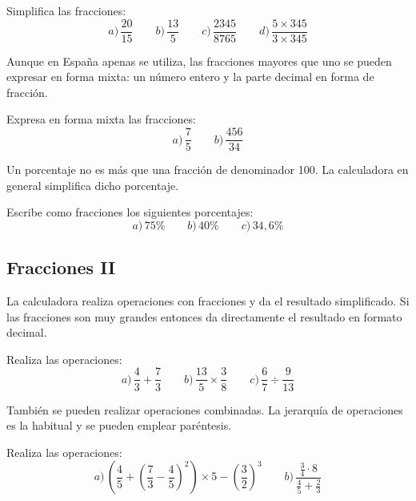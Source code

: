 \documentclass[12pt]{article}
\newenvironment{capitulo}{\begin{tcolorbox}[colback=blue!5!white,colframe=red!75!black]}{\end{tcolorbox}\bigskip}
\newenvironment{ejer}{\begin{tcolorbox}[center title, 
fonttitle=\sffamily\bfseries,colback=blue!5,colframe=orange]}{\end{tcolorbox}}
\begin{document}
\begin{ejer}

Simplifica las fracciones:
\[
a)\, \frac{20}{15} \qquad b)\, \frac{13}{5} \qquad c)\, \frac{2345}{8765} \qquad d)\, \frac{5\times 345}{3\times 345} 
\]

\end{ejer}

Aunque en España apenas se utiliza, las fracciones mayores que uno se pueden expresar en forma mixta: un número entero y la parte decimal en forma de fracción.

\begin{ejer} 

Expresa en forma mixta las fracciones:
\[
a)\, \frac{7}{5} \qquad b)\, \frac{456}{34}
\]

\end{ejer}

Un porcentaje no es más que una fracción de denominador 100. La calculadora en general simplifica dicho porcentaje.

\begin{ejer}

Escribe como fracciones los siguientes porcentajes:
\[
a)\, 75\% \qquad b)\, 40\% \qquad c)\, 34,6\%
\]
\end{ejer}





\newpage
\begin{capitulo}
\section*{Fracciones II}
\end{capitulo}

La calculadora realiza operaciones con fracciones y da el resultado simplificado. Si las fracciones son muy grandes entonces da directamente el resultado en formato decimal.

\begin{ejer} 

Realiza las operaciones:
\[
a)\,\frac{4}{3} + \frac{7}{3} \qquad b)\, \frac{13}{5}\times\frac{3}{8} \qquad c)\, \frac{6}{7} \div \frac{9}{13}
\]

\end{ejer}

También se pueden realizar operaciones combinadas. La jerarquía de operaciones es la habitual y se pueden emplear paréntesis.

\begin{ejer} 

Realiza las operaciones:
\[
 a)\,\left(\frac{4}{5}+ \left(\frac{7}{3} -\frac{4}{5}\right)^2\right) \times 5 - \left(\frac{3}{2}\right)^3
\qquad b)\,\frac{\frac{3}{4} \cdot 8}{\frac{4}{5} +\frac{2}{3}}
\]

\end{ejer}
\end{document}
